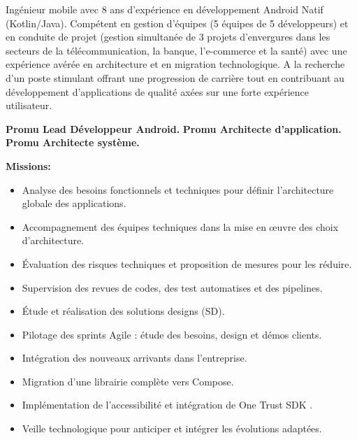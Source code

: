 \documentclass[10pt,a4paper,withhyper]{altacv}
\begin{document}


\makecvheader



\begin{paracol}{2}
	

{
Ingénieur mobile avec 8 ans d’expérience en développement Android Natif (Kotlin/Java). \newline Compétent en gestion d’équipes (5 équipes de 5 développeurs) et en conduite de projet (gestion simultanée de 3 projets d’envergures dans les secteurs de la télécommunication, la banque, l’e-commerce et la santé) avec une expérience avérée en architecture et en migration technologique. \newline A la recherche d’un poste stimulant offrant une progression de carrière tout en contribuant au développement d’applications de qualité axées sur une forte expérience utilisateur.
}



\textbf{Promu Lead Développeur Android.}
\newline
\textbf{Promu Architecte d’application.}
\newline
\textbf{Promu Architecte système.}
\newline

\textbf{Missions:}
\begin{itemize}
\addtolength{\itemindent}{0.1cm}
\item Analyse des besoins fonctionnels et techniques pour définir l’architecture
globale des applications.
\item Accompagnement des équipes techniques dans la mise en œuvre des choix
d’architecture.
\item Évaluation des risques techniques et proposition de mesures pour les réduire.
\item Supervision des revues de codes, des test automatises et des pipelines.
\item Étude et réalisation des solutions designs (SD).
\item Pilotage des sprints Agile : étude des besoins, design et démos clients.
\item Intégration des nouveaux arrivants dans l’entreprise.
\item Migration d’une librairie complète vers Compose.
\item Implémentation de l’accessibilité et intégration de One Trust SDK .
\item Veille technologique pour anticiper et intégrer les évolutions adaptées.
\end{itemize}


\end{paracol}
\end{document}
